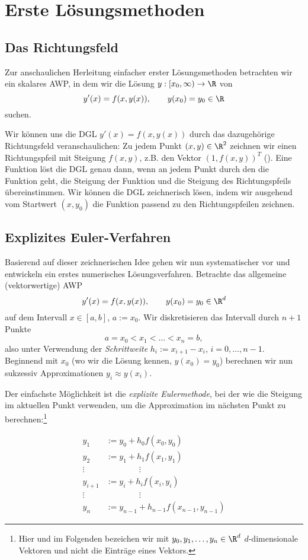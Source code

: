 \documentclass[
]{mycourse}
\theoremstyle{mythm}
\theoremstyle{break}
\begin{document}
\section{Erste Lösungsmethoden}\label{Sect:NumODE_Motivation}

\subsection{Das Richtungsfeld}

Zur anschaulichen Herleitung einfacher erster Lösungsmethoden betrachten wir ein skalares AWP, 
in dem wir die Lösung $y: [x_0,\infty)\to \R$ von
\[
y'(x)=f(x,y(x)), \qquad y(x_0)=y_0\in \R
\]
suchen.

Wir können uns die DGL $y'(x)=f(x,y(x))$ durch das dazugehörige Richtungsfeld veranschaulichen: Zu jedem Punkt
$(x,y)\in \R^2$ zeichnen wir einen Richtungspfeil mit Steigung $f(x,y)$, z.B. den Vektor $(1,f(x,y))^T$ (\fixme[Bild: Richtungsfeld $f(x,y(x))=x$]). Eine Funktion löst die DGL genau dann, wenn an jedem
Punkt durch den die Funktion geht, die Steigung der Funktion und die Steigung des Richtungspfeils übereinstimmen.
Wir können die DGL zeichnerisch lösen, indem wir ausgehend vom Startwert $(x,y_0)$ die Funktion passend 
zu den Richtungspfeilen zeichnen.

\subsection{Explizites Euler-Verfahren}

Basierend auf dieser zeichnerischen Idee gehen wir nun systematischer vor und entwickeln ein erstes numerisches Lösungsverfahren.
Betrachte das allgemeine (vektorwertige) AWP
\[
y'(x)=f(x,y(x)), \qquad y(x_0)=y_0\in \R^d
\]
auf dem Intervall $x\in [a,b]$, $a:=x_0$. Wir diskretisieren das Intervall durch $n+1$ Punkte
\[
a=x_0 < x_1 < \ldots < x_n=b,
\]
also unter Verwendung der \emph{Schrittweite}
$h_i:=x_{i+1}-x_i$, $i=0,\ldots,n-1$.
Beginnend mit $x_0$ (wo wir die Lösung kennen, $y(x_0)=y_0$) berechnen wir 
nun sukzessiv Approximationen $y_i\approx y(x_i)$. 

Der einfachste Möglichkeit ist die \emph{explizite Eulermethode}, bei der wie die Steigung im aktuellen
Punkt verwenden, um die Approximation im nächsten Punkt zu berechnen:\footnote{Hier und im Folgenden bezeichen wir mit $y_0, y_1,\ldots, y_n\in \R^d$ $d$-dimensionale Vektoren und nicht die Einträge eines Vektors.}

\begin{align*}
y_1 & :=y_0+h_0 f(x_0,y_0)\\
y_2 & :=y_1+h_1 f(x_1,y_1)\\
\vdots \;&\qquad\qquad \vdots\\
y_{i+1} & :=y_i+h_i f(x_i,y_i)\\
\vdots \;&\qquad\qquad \vdots\\
y_n & :=y_{n-1}+h_{n-1} f(x_{n-1},y_{n-1})
\end{align*}
\end{document}
